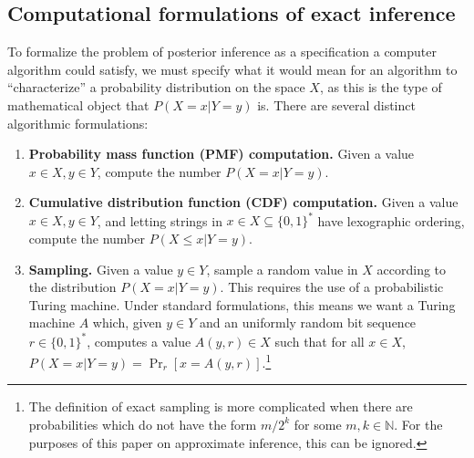 \documentclass{article}
\theoremstyle{definition}
\theoremstyle{remark}
\begin{document}
\subsection{Computational formulations of exact inference}
To formalize the problem of posterior inference as a specification a computer algorithm could satisfy, we must specify what it would mean for an algorithm to ``characterize'' a probability distribution on the space $X$, as this is the type of mathematical object that $P(X = x | Y = y)$ is.
There are several distinct algorithmic formulations:
\begin{enumerate}
    \item \textbf{Probability mass function (PMF) computation.} Given a value $x \in X, y \in Y$, compute the number $P(X = x | Y = y)$.
    \item \textbf{Cumulative distribution function (CDF) computation.} Given a value $x \in X, y \in Y$, and letting strings in $x \in X \subseteq \{0, 1\}^*$ have lexographic ordering, compute the number $P(X \leq x | Y = y)$.
    \item \textbf{Sampling.} Given a value $y \in Y$, sample a random value in $X$ according to the distribution $P(X = x | Y = y)$.  This requires the use of a probabilistic Turing machine.  Under standard formulations, this means we want a Turing machine $A$ which, given $y \in Y$ and an uniformly random bit sequence $r \in \{0, 1\}^*$, computes a value $A(y, r) \in X$ such that for all $x \in X$, $P(X = x | Y = y) = \Pr_r[x = A(y, r)]$.\footnote{
        The definition of exact sampling is more complicated when there are probabilities which do not have the form $m/2^k$ for some $m, k \in \mathbb{N}$.
        For the purposes of this paper on approximate inference, this can be ignored.
    }
\end{enumerate}
\end{document}
